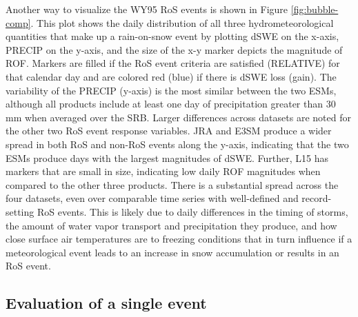 \documentclass[nhess, manuscript]{copernicus}
\begin{document}
Another way to visualize the WY95 RoS events is shown in Figure \ref{fig:bubble-comp}.
This plot shows the daily distribution of all three hydrometeorological quantities that make up a rain-on-snow event by plotting dSWE on the x-axis, PRECIP on the y-axis, and the size of the x-y marker depicts the magnitude of ROF.
Markers are filled if the RoS event criteria are satisfied (RELATIVE) for that calendar day and are colored red (blue) if there is dSWE loss (gain).
The variability of the PRECIP (y-axis) is the most similar between the two ESMs, although all products include at least one day of precipitation greater than 30 mm when averaged over the SRB.
Larger differences across datasets are noted for the other two RoS event response variables.
JRA and E3SM produce a wider spread in both RoS and non-RoS events along the y-axis, indicating that the two ESMs produce days with the largest magnitudes of dSWE.
Further, L15 has markers that are small in size, indicating low daily ROF magnitudes when compared to the other three products.
There is a substantial spread across the four datasets, even over comparable time series with well-defined and record-setting RoS events.
This is likely due to daily differences in the timing of storms, the amount of water vapor transport and precipitation they produce, and how close surface air temperatures are to freezing conditions that in turn influence if a meteorological event leads to an increase in snow accumulation or results in an RoS event.

\subsection{Evaluation of a single event}


\end{document}
